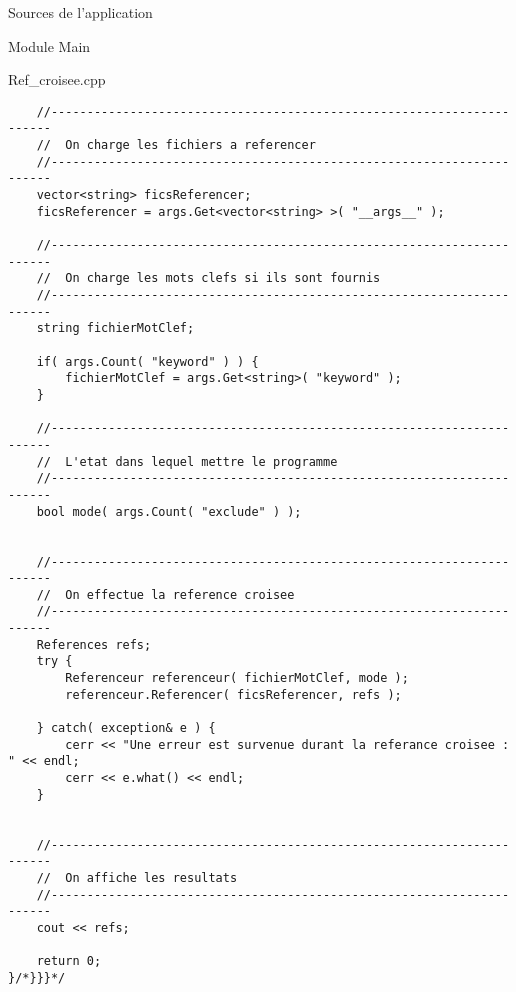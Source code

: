 \documentclass{article}
\begin{document}
\begin{section}{Sources de l'application}
\begin{subsection}{Module Main}
\begin{paragraph}{Ref\_croisee.cpp}
\begin{verbatim}
    //----------------------------------------------------------------------
    //  On charge les fichiers a referencer
    //----------------------------------------------------------------------
    vector<string> ficsReferencer;
    ficsReferencer = args.Get<vector<string> >( "__args__" );

    //----------------------------------------------------------------------
    //  On charge les mots clefs si ils sont fournis
    //----------------------------------------------------------------------
    string fichierMotClef;

    if( args.Count( "keyword" ) ) {
        fichierMotClef = args.Get<string>( "keyword" );
    }

    //----------------------------------------------------------------------
    //  L'etat dans lequel mettre le programme
    //----------------------------------------------------------------------
    bool mode( args.Count( "exclude" ) );


    //----------------------------------------------------------------------
    //  On effectue la reference croisee
    //----------------------------------------------------------------------
    References refs;
    try {
        Referenceur referenceur( fichierMotClef, mode );
        referenceur.Referencer( ficsReferencer, refs );

    } catch( exception& e ) {
        cerr << "Une erreur est survenue durant la referance croisee : " << endl;
        cerr << e.what() << endl;
    }


    //----------------------------------------------------------------------
    //  On affiche les resultats
    //----------------------------------------------------------------------
    cout << refs; 

    return 0;
}/*}}}*/
  \end{verbatim}
  \end{paragraph}

  \end{subsection}

\end{section}
\end{document}
